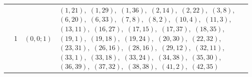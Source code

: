 \documentclass[11pt]{article}
\begin{document}
\begin{longtable}{@{}rrl>{\raggedright\arraybackslash}p{}@{}}
\addlinespace[3pt]
43 & 1 & $(0,0;1)$ & $(1,21)$,\allowbreak\ $(1,29)$,\allowbreak\ $(1,36)$,\allowbreak\ $(2,14)$,\allowbreak\ $(2,22)$,\allowbreak\ $(3,8)$,\allowbreak\ $(6,20)$,\allowbreak\ $(6,33)$,\allowbreak\ $(7,8)$,\allowbreak\ $(8,2)$,\allowbreak\ $(10,4)$,\allowbreak\ $(11,3)$,\allowbreak\ $(13,11)$,\allowbreak\ $(16,27)$,\allowbreak\ $(17,15)$,\allowbreak\ $(17,37)$,\allowbreak\ $(18,35)$,\allowbreak\ $(19,1)$,\allowbreak\ $(19,18)$,\allowbreak\ $(19,24)$,\allowbreak\ $(20,30)$,\allowbreak\ $(22,32)$,\allowbreak\ $(23,31)$,\allowbreak\ $(26,16)$,\allowbreak\ $(28,16)$,\allowbreak\ $(29,12)$,\allowbreak\ $(32,11)$,\allowbreak\ $(33,1)$,\allowbreak\ $(33,18)$,\allowbreak\ $(33,24)$,\allowbreak\ $(34,38)$,\allowbreak\ $(35,30)$,\allowbreak\ $(36,39)$,\allowbreak\ $(37,32)$,\allowbreak\ $(38,38)$,\allowbreak\ $(41,2)$,\allowbreak\ $(42,35)$\\

\end{longtable}
\end{document}
